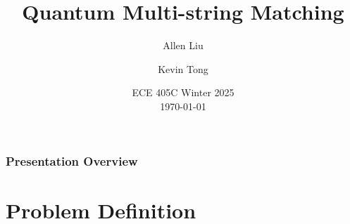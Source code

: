 \documentclass[
	11pt, %
]{beamer}
\title[Quantum Multi-string Matching]{Quantum Multi-string Matching} %
\author[Allen Liu \and Kevin Tong]{Allen Liu \and Kevin Tong} %
\institute[UW]{University of Waterloo} %
\date[\today]{ECE 405C Winter 2025 \\ \today} %
\begin{document}

\begin{frame}
    \titlepage %
\end{frame}



\begin{frame}
    \frametitle{Presentation Overview} %

    \tableofcontents %
\end{frame}


\section{Problem Definition} %
\end{document}
